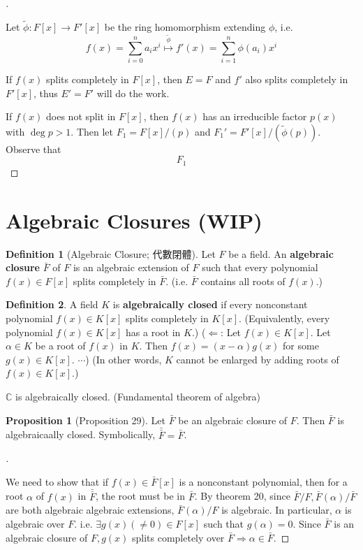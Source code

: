 \documentclass{article}
\theoremstyle{definition}
\newtheorem{dfn}{Definition}
\newtheorem{prop}{Proposition}
\newenvironment{proofs}[1][\proofname]{%
  \begin{proof}[#1]$ $\par\nobreak\ignorespaces
}{%
  \end{proof}
}
\begin{document}
\begin{proofs}
	Let $\tilde{\phi}:F[x]\to F'[x]$ be the ring homomorphism extending $\phi$, i.e.
	\[f(x)=\sum_{i=0}^n a_i x^i \overset{\tilde{\phi}}{\mapsto} f'(x)=\sum_{i=1}^n \phi(a_i) x^i\]
	
	If $f(x)$ splits completely in $F[x]$, then $E=F$ and $f'$ also splits completely in $F'[x]$, thus $E'=F'$ will do the work.

	If $f(x)$ does not split in $F[x]$, then $f(x)$ has an irreducible factor $p(x)$ with $\deg p>1$.
	Then let $F_1=F[x]/(p)$ and $F_1'=F'[x]/(\tilde{\phi}(p))$. Observe that
	\[F_1\]

\end{proofs}

\section{Algebraic Closures (WIP)}

\begin{dfn}[Algebraic Closure; 代數閉體]
	Let $F$ be a field. 
	An \textbf{algebraic closure} $\bar{F}$ of $F$ is an algebraic extension of $F$ such that every polynomial $f(x) \in F[x]$ splits completely in $\bar{F}$.
	(i.e. $\bar{F}$ contains all roots of $f(x)$.)
\end{dfn}

\begin{dfn}
	A field $K$ is \textbf{algebraically closed} if every nonconstant polynomial $f(x) \in K[x]$ splits completely in $K[x]$. 
	(Equivalently, every polynomial $f(x) \in K[x]$ has a root in $K$.)
	($\Leftarrow$: Let $f(x) \in K[x]$. 
	Let $\alpha \in K$ be a root of $f(x)$ in $K$.
	Then $f(x) = (x - \alpha) g(x)$ for some $g(x) \in K[x]$. $\cdots$)
	(In other words, $K$ cannot be enlarged by adding roots of $f(x) \in K[x]$.)
\end{dfn}

\begin{ex}
	$\mathbb{C}$ is algebraically closed.
	(Fundamental theorem of algebra)
\end{ex}

\begin{prop}[Proposition 29]
	Let $\bar{F}$ be an algebraic closure of $F$. 
	Then $\bar{F}$ is algebraicaally closed.
	Symbolically, $\bar{\bar{F}} = \bar{F}$.
\end{prop}

\begin{proofs}
	We need to show that if $f(x) \in \bar{F}[x]$ is a nonconstant polynomial, then for a root $\alpha$ of $f(x)$ in $\bar{\bar{F}}$, the root must be in $\bar{F}$. 
	By theorem 20, since $\bar{F}/F, \bar{F}(\alpha)/\bar{F}$ are both algebraic algebraic extensions, $\bar{F}(\alpha)/F$ is algebraic.
	In particular, $\alpha$ is algebraic over $F$.
	i.e. $\exists g(x) ( \neq 0)\in F[x]$ such that $g(\alpha) = 0$.
	Since $\bar{F}$ is an algebraic closure of $F, g(x)$ splits completely over $\bar{F} \Rightarrow \alpha \in \bar{F}$.
\end{proofs}
\end{document}
